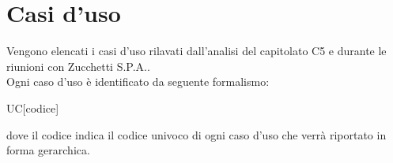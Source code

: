 \section{Casi d'uso}
Vengono elencati i casi d'uso rilavati dall'analisi del capitolato C5 e durante le riunioni con Zucchetti S.P.A.. \\
Ogni caso d'uso è identificato da seguente formalismo:
\begin{center}
	UC[codice]
\end{center}
dove il codice indica il codice univoco di ogni caso d'uso che verrà riportato in forma gerarchica.

















